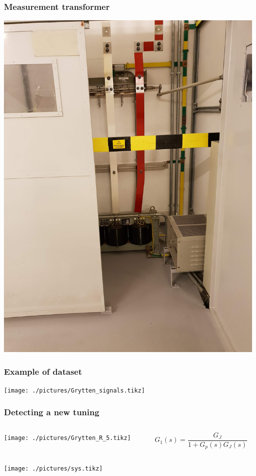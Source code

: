 \begin{frame}
	\frametitle{Measurement transformer}
	\includegraphics[angle=-90, origin=c, height=\textheight]{./pictures/trafo.jpg}
\end{frame}
\begin{frame}
	\frametitle{Example of dataset}
	\texttt{[image: ./pictures/Grytten\_signals.tikz]}
\end{frame}
\begin{frame}
	\frametitle{Detecting a new tuning}
	\begin{columns}
		\begin{column}{0.65\textwidth}
			\texttt{[image: ./pictures/Grytten\_R\_5.tikz]}
		\end{column}
		\begin{column}{0.35\textwidth}
			\begin{equation*}
				G_1(s) = \frac{G_{J}}{1+G_p(s)G_J(s)}
			\end{equation*}
		\end{column}
	\end{columns}
	\texttt{[image: ./pictures/sys.tikz]}
\end{frame}	
